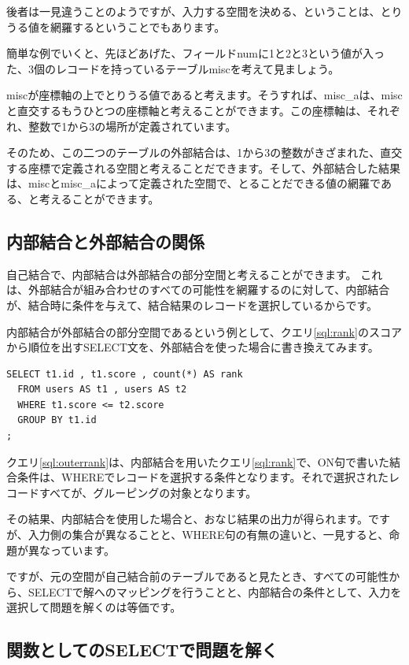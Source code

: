 後者は一見違うことのようですが、入力する空間を決める、ということは、とりうる値を網羅するということでもあります。

簡単な例でいくと、先ほどあげた、フィールドnumに1と2と3という値が入った、3個のレコードを持っているテーブルmiscを考えて見ましょう。

miscが座標軸の上でとりうる値であると考えます。そうすれば、misc\_aは、miscと直交するもうひとつの座標軸と考えることができます。この座標軸は、それぞれ、整数で1から3の場所が定義されています。

そのため、この二つのテーブルの外部結合は、1から3の整数がきざまれた、直交する座標で定義される空間と考えることだできます。そして、外部結合した結果は、miscとmisc\_aによって定義された空間で、とることだできる値の網羅である、と考えることができます。

\subsection{内部結合と外部結合の関係}

自己結合で、内部結合は外部結合の部分空間と考えることができます。
これは、外部結合が組み合わせのすべての可能性を網羅するのに対して、内部結合が、結合時に条件を与えて、結合結果のレコードを選択しているからです。

内部結合が外部結合の部分空間であるという例として、クエリ\ref{sql:rank}のスコアから順位を出すSELECT文を、外部結合を使った場合に書き換えてみます。

\begin{lstlisting}[caption=外部結合で書く,label=sql:outerrank]
SELECT t1.id , t1.score , count(*) AS rank
  FROM users AS t1 , users AS t2
  WHERE t1.score <= t2.score
  GROUP BY t1.id
;
\end{lstlisting}

クエリ\ref{sql:outerrank}は、内部結合を用いたクエリ\ref{sql:rank}で、ON句で書いた結合条件は、WHEREでレコードを選択する条件となります。それで選択されたレコードすべてが、グルーピングの対象となります。

その結果、内部結合を使用した場合と、おなじ結果の出力が得られます。ですが、入力側の集合が異なることと、WHERE句の有無の違いと、一見すると、命題が異なっています。

ですが、元の空間が自己結合前のテーブルであると見たとき、すべての可能性から、SELECTで解へのマッピングを行うことと、内部結合の条件として、入力を選択して問題を解くのは等価です。

\subsection{関数としてのSELECTで問題を解く}

